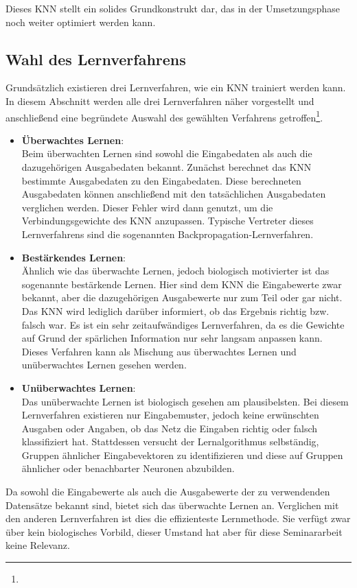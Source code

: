 Dieses KNN stellt ein solides Grundkonstrukt dar, das in der Umsetzungsphase noch weiter optimiert werden kann.

\subsection{Wahl des Lernverfahrens} 
\label{subsection:Wahl des Lernverfahrens}

Grundsätzlich existieren drei Lernverfahren, wie ein KNN trainiert werden kann. In diesem Abschnitt werden alle drei Lernverfahren näher vorgestellt und anschließend eine begründete Auswahl des gewählten Verfahrens getroffen\footnote{\Vgl{}}.

\begin{itemize}
\item \textbf{Überwachtes Lernen}: \\
Beim überwachten Lernen sind sowohl die Eingabedaten als auch die dazugehörigen Ausgabedaten bekannt. Zunächst berechnet das KNN bestimmte Ausgabedaten zu den Eingabedaten. Diese berechneten Ausgabedaten können anschließend mit den tatsächlichen Ausgabedaten verglichen werden. Dieser Fehler wird dann genutzt, um die Verbindungsgewichte des KNN anzupassen. Typische Vertreter dieses Lernverfahrens sind die sogenannten Backpropagation-Lernverfahren.
	
\item \textbf{Bestärkendes Lernen}: \\
Ähnlich wie das überwachte Lernen, jedoch biologisch motivierter ist das sogenannte bestärkende Lernen. Hier sind dem KNN die Eingabewerte zwar bekannt, aber die dazugehörigen Ausgabewerte nur zum Teil oder gar nicht. Das KNN wird lediglich darüber informiert, ob das Ergebnis richtig bzw. falsch war. Es ist ein sehr zeitaufwändiges Lernverfahren, da es die Gewichte auf Grund der spärlichen Information nur sehr langsam anpassen kann. Dieses Verfahren kann als Mischung aus überwachtes Lernen und unüberwachtes Lernen gesehen werden.

\item \textbf{Unüberwachtes Lernen}: \\
Das unüberwachte Lernen ist biologisch gesehen am plausibelsten. Bei diesem  Lernverfahren existieren nur Eingabemuster, jedoch keine erwünschten Ausgaben oder Angaben, ob das Netz die Eingaben richtig oder falsch klassifiziert hat. Stattdessen versucht der Lernalgorithmus selbständig, Gruppen ähnlicher Eingabevektoren zu identifizieren und diese auf Gruppen ähnlicher oder benachbarter Neuronen abzubilden. 
\end{itemize}

Da sowohl die Eingabewerte als auch die Ausgabewerte der zu verwendenden Datensätze bekannt sind, bietet sich das überwachte Lernen an. Verglichen mit den anderen Lernverfahren ist dies die effizienteste Lernmethode. Sie verfügt zwar über kein biologisches Vorbild, dieser Umstand hat aber für diese Seminararbeit keine Relevanz.
